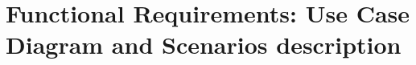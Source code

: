 \newpage
\section{Functional Requirements: Use Case Diagram and Scenarios description}














